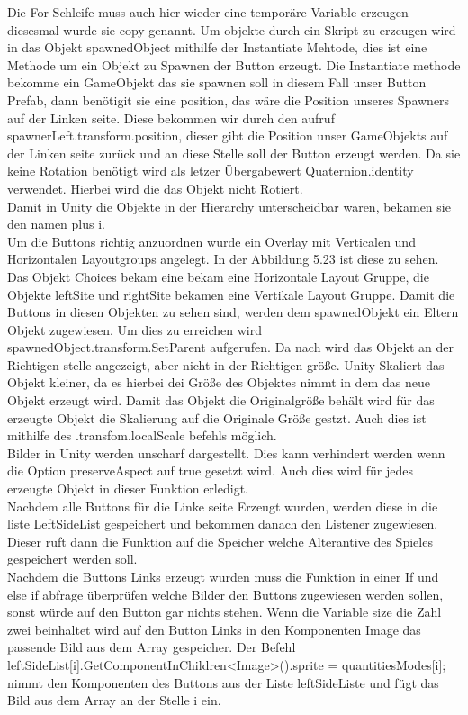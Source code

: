 Die For-Schleife muss auch hier wieder eine temporäre Variable erzeugen diesesmal wurde sie copy genannt. Um objekte durch ein Skript zu erzeugen wird in das Objekt spawnedObject mithilfe der Instantiate Mehtode, dies ist eine Methode um ein Objekt zu Spawnen der Button erzeugt. Die Instantiate methode bekomme ein GameObjekt das sie spawnen soll in diesem Fall unser Button Prefab, dann benötigit sie eine position, das wäre die Position unseres Spawners auf der Linken seite. Diese bekommen wir durch den aufruf spawnerLeft.transform.position, dieser gibt die Position unser GameObjekts auf der Linken seite zurück und an diese Stelle soll der Button erzeugt werden. Da sie keine Rotation benötigt wird als letzer Übergabewert Quaternion.identity verwendet. Hierbei wird die das Objekt nicht Rotiert.\\
Damit in Unity die Objekte in der Hierarchy unterscheidbar waren, bekamen sie den namen plus i.\\
Um die Buttons richtig anzuordnen wurde ein Overlay mit Verticalen und Horizontalen Layoutgroups angelegt. In der Abbildung 5.23 ist diese zu sehen. Das Objekt Choices bekam eine bekam eine Horizontale Layout Gruppe, die Objekte leftSite und rightSite bekamen eine Vertikale Layout Gruppe. 
Damit die Buttons in diesen Objekten zu sehen sind, werden dem spawnedObjekt ein Eltern Objekt zugewiesen. Um dies zu erreichen wird spawnedObject.transform.SetParent aufgerufen. Da nach wird das Objekt an der Richtigen stelle angezeigt, aber nicht in der Richtigen größe. Unity Skaliert das Objekt kleiner, da es hierbei dei Größe des Objektes nimmt in dem das neue Objekt erzeugt wird. Damit das Objekt die Originalgröße behält wird für das erzeugte Objekt die Skalierung auf die Originale Größe gestzt. Auch dies ist mithilfe des .transfom.localScale befehls möglich.\\
Bilder in Unity werden unscharf dargestellt. Dies kann verhindert werden wenn die Option preserveAspect auf true gesetzt wird. Auch dies wird für jedes erzeugte Objekt in dieser Funktion erledigt.\\
Nachdem alle Buttons für die Linke seite Erzeugt wurden, werden diese in die liste LeftSideList gespeichert und bekommen danach den Listener zugewiesen. Dieser ruft dann die Funktion auf die Speicher welche Alterantive des Spieles gespeichert werden soll.\\
Nachdem die Buttons Links erzeugt wurden muss die Funktion in einer If und else if abfrage überprüfen welche Bilder den Buttons zugewiesen werden sollen, sonst würde auf den Button gar nichts stehen. Wenn die Variable size die Zahl zwei beinhaltet wird auf den Button Links in den Komponenten Image das passende Bild aus dem Array gespeicher. Der Befehl  leftSideList[i].GetComponentInChildren<Image>().sprite = quantitiesModes[i]; nimmt den Komponenten des Buttons aus der Liste leftSideListe und fügt das Bild aus dem Array an der Stelle i ein.\\
